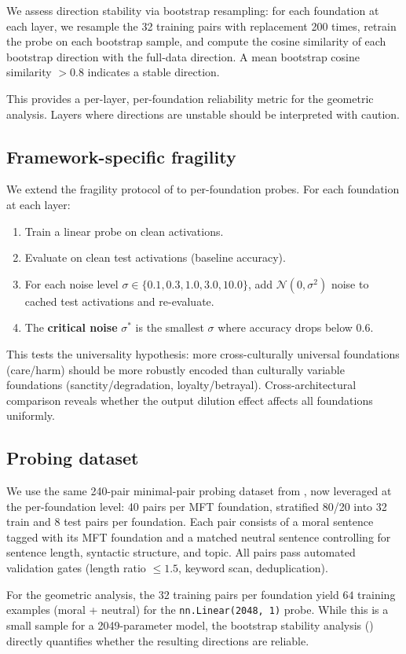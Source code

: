 We assess direction stability via bootstrap resampling: for each
foundation at each layer, we resample the 32 training pairs with
replacement 200 times, retrain the probe on each bootstrap sample,
and compute the cosine similarity of each bootstrap direction with
the full-data direction. A mean bootstrap cosine similarity \(> 0.8\)
indicates a stable direction.

This provides a per-layer, per-foundation reliability metric for the
geometric analysis. Layers where directions are unstable should be
interpreted with caution.

\subsection{Framework-specific fragility}\label{framework-specific-fragility}

We extend the fragility protocol of
\citet{reblitzrichardson2026fragility} to per-foundation probes.
For each foundation at each layer:

\begin{enumerate}
\def\labelenumi{\arabic{enumi}.}
\tightlist
\item
  Train a linear probe on clean activations.
\item
  Evaluate on clean test activations (baseline accuracy).
\item
  For each noise level \(\sigma \in \{0.1, 0.3, 1.0, 3.0, 10.0\}\),
  add \(\mathcal{N}(0, \sigma^2)\) noise to cached test activations
  and re-evaluate.
\item
  The \textbf{critical noise} \(\sigma^*\) is the smallest \(\sigma\) where
  accuracy drops below 0.6.
\end{enumerate}

This tests the universality hypothesis: more cross-culturally
universal foundations (care/harm) should be more robustly encoded
than culturally variable foundations (sanctity/degradation,
loyalty/betrayal). Cross-architectural comparison reveals whether
the output dilution effect \citep{reblitzrichardson2026dilution}
affects all foundations uniformly.

\subsection{Probing dataset}\label{probing-dataset}

We use the same 240-pair minimal-pair probing dataset from
\citet{reblitzrichardson2026fragility}, now leveraged at the
per-foundation level: 40 pairs per MFT foundation, stratified
80/20 into 32 train and 8 test pairs per foundation. Each pair
consists of a moral sentence tagged with its MFT foundation and a
matched neutral sentence controlling for sentence length, syntactic
structure, and topic. All pairs pass automated validation gates
(length ratio \(\leq 1.5\), keyword scan, deduplication).

For the geometric analysis, the 32 training pairs per foundation
yield \(64\) training examples (moral + neutral) for the
\texttt{nn.Linear(2048,\ 1)} probe. While this is a small sample for a
2049-parameter model, the bootstrap stability analysis ()
directly quantifies whether the resulting directions are reliable.
